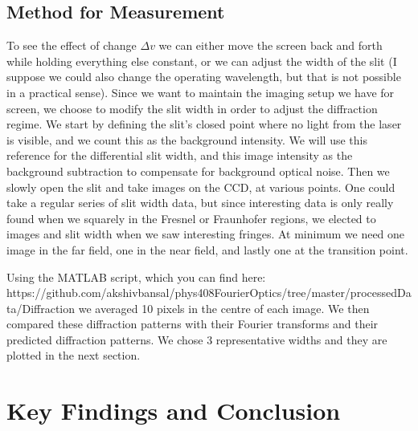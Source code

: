 \documentclass[11pt]{article}
\begin{document}
\subsection{Method for Measurement}
To see the effect of change $\Delta v$ we can either move the screen back and forth while holding everything else constant, or we can adjust the width of the slit (I suppose we could also change the operating wavelength, but that is not possible in a practical sense). Since we want to maintain the imaging setup we have for screen, we choose to modify the slit width in order to adjust the diffraction regime. We start by defining the slit’s closed point where no light from the laser is visible, and we count this as the background intensity. We will use this reference for the differential slit width, and this image intensity as the background subtraction to compensate for background optical noise. Then we slowly open the slit and take images on the CCD, at various points. One could take a regular series of slit width data, but since interesting data is only really found when we squarely in the Fresnel or Fraunhofer regions, we elected to images and slit width when we saw interesting fringes. At minimum we need one image in the far field, one in the near field, and lastly one at the transition point. 

Using the MATLAB script, which you can find here: https://github.com/akshivbansal/phys408FourierOptics/tree/master/processedData/Diffraction we averaged 10 pixels in the centre of each image. We then compared these diffraction patterns with their Fourier transforms and their predicted diffraction patterns. We chose 3 representative widths and they are plotted in the next section. 

\section{Key Findings and Conclusion}
\vspace{-8mm}

\begin{figure}[H]
	\centering
\end{figure}

\vspace{-10mm}
\end{document}
